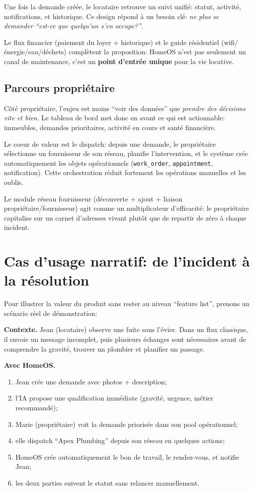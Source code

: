 \documentclass[11pt,a4paper]{article}
\begin{document}
Une fois la demande créée, le locataire retrouve un suivi unifié: statut, activité, notifications, et historique. Ce design répond à un besoin clé: \textit{ne plus se demander ``est-ce que quelqu'un s'en occupe?''}.

Le flux financier (paiement du loyer + historique) et le guide résidentiel (wifi/énergie/eau/déchets) complètent la proposition: HomeOS n'est pas seulement un canal de maintenance, c'est un \textbf{point d'entrée unique} pour la vie locative.

\subsection{Parcours propriétaire}

Côté propriétaire, l'enjeu est moins ``voir des données'' que \textit{prendre des décisions vite et bien}. Le tableau de bord met donc en avant ce qui est actionnable: immeubles, demandes prioritaires, activité en cours et santé financière.

Le coeur de valeur est le dispatch: depuis une demande, le propriétaire sélectionne un fournisseur de son réseau, planifie l'intervention, et le système crée automatiquement les objets opérationnels (\texttt{work\_order}, \texttt{appointment}, notification). Cette orchestration réduit fortement les opérations manuelles et les oublis.

Le module réseau fournisseur (découverte + ajout + liaison propriétaire/fournisseur) agit comme un multiplicateur d'efficacité: le propriétaire capitalise sur un carnet d'adresses vivant plutôt que de repartir de zéro à chaque incident.

\section{Cas d'usage narratif: de l'incident à la résolution}

Pour illustrer la valeur du produit sans rester au niveau ``feature list'', prenons un scénario réel de démonstration:

\textbf{Contexte.} Jean (locataire) observe une fuite sous l'évier. Dans un flux classique, il envoie un message incomplet, puis plusieurs échanges sont nécessaires avant de comprendre la gravité, trouver un plombier et planifier un passage.

\textbf{Avec HomeOS.}
\begin{enumerate}[leftmargin=1.4em]
  \item Jean crée une demande avec photos + description;
  \item l'IA propose une qualification immédiate (gravité, urgence, métier recommandé);
  \item Marie (propriétaire) voit la demande priorisée dans son pool opérationnel;
  \item elle dispatch ``Apex Plumbing'' depuis son réseau en quelques actions;
  \item HomeOS crée automatiquement le bon de travail, le rendez-vous, et notifie Jean;
  \item les deux parties suivent le statut sans relancer manuellement.
\end{enumerate}
\end{document}

